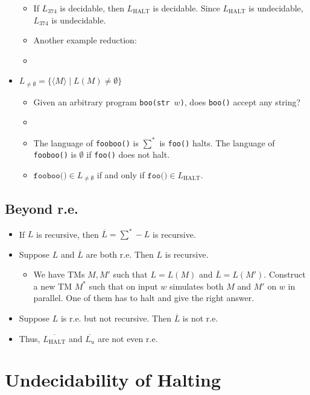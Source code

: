 \begin{itemize}
\begin{itemize}
        \item If $L_{374}$ is decidable, then $L_\text{HALT}$ is decidable. Since $L_\text{HALT}$ is undecidable, $L_{374}$ is undecidable.
        \item Another example reduction:
        \item[] 
    \end{itemize}
    \item $L_{\neq \emptyset} = \{ \langle M \rangle \mid L(M) \neq \emptyset \}$
    \begin{itemize}
        \item Given an arbitrary program \texttt{boo(str $w$)}, does \texttt{boo()} accept any string?
        \item[] 
        \item The language of \texttt{fooboo()} is $\sum^\ast$ is \texttt{foo()} halts. The language of \texttt{fooboo()} is $\emptyset$ if \texttt{foo()} does not halt.
        \item $\texttt{fooboo()} \in L_{\neq \emptyset}$ if and only if $\texttt{foo()} \in L_\text{HALT}$.
    \end{itemize}
\end{itemize}

\subsection{Beyond r.e.}
\begin{itemize}
    \item If $L$ is recursive, then $\overline{L} = \sum^\ast - L$ is recursive.
    \item Suppose $L$ and $\overline{L}$ are both r.e. Then $L$ is recursive.
    \begin{itemize}
        \item We have TMs $M, M'$ such that $L = L(M)$ and $\overline{L} = L(M')$. Construct a new TM $M^\ast$ such that on input $w$ simulates both $M$ and $M'$ on $w$ in parallel. One of them has to halt and give the right answer.
    \end{itemize}
    \item Suppose $L$ is r.e. but not recursive. Then $\overline{L}$ is not r.e.
    \item Thus, $\overline{L_\text{HALT}}$ and $\overline{L_u}$ are not even r.e.
\end{itemize}

\section{Undecidability of Halting}

